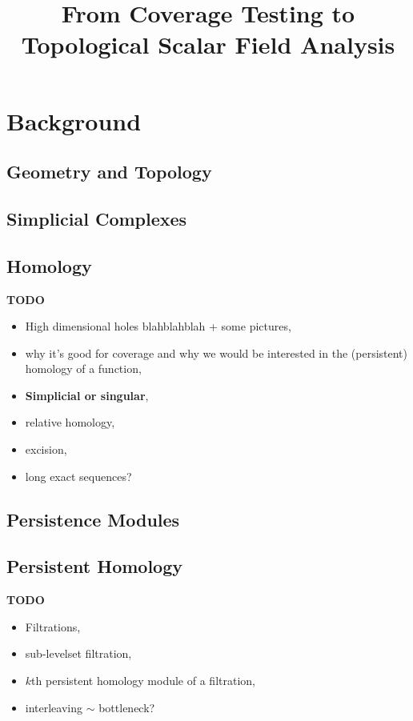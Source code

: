 \documentclass[12pt]{article}
\begin{document}
\title{From Coverage Testing to Topological Scalar Field Analysis}




\section{Background}

\subsection{Geometry and Topology}
  

\subsection{Simplicial Complexes}\label{sec:complexes}
  


\subsection{Homology}\label{sec:homology}
  \textbf{TODO}
  \begin{itemize}
    \item High dimensional holes blahblahblah + some pictures,
    \item why it's good for coverage and why we would be interested in the (persistent) homology of a function,
    \item \textbf{Simplicial or singular},
    \item relative homology,
    \item excision,
    \item long exact sequences?
  \end{itemize}

\subsection{Persistence Modules}
  

\subsection{Persistent Homology}
  \textbf{TODO}
  \begin{itemize}
    \item Filtrations,
    \item sub-levelset filtration,
    \item $k$th persistent homology module of a filtration,
    \item interleaving $\sim$ bottleneck?
  \end{itemize}
\end{document}
